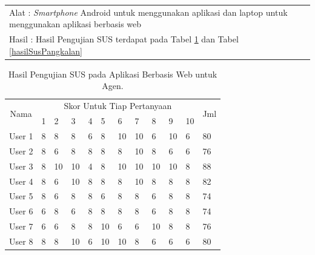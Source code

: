 	\begin{center}
	\begin{tabular}{ |p{12cm}|  }
		\hline
		Alat   : \textit{Smartphone} Android untuk menggunakan aplikasi dan laptop untuk menggunakan aplikasi berbasis web\\
		Hasil : Hasil Pengujian SUS terdapat pada Tabel \ref{hasilSusAgen} dan Tabel \ref{hasilSusPangkalan}\\
		\hline
	\end{tabular}
\end{center}

\begin{table}[H]
	\center
	\caption{Hasil Pengujian SUS pada Aplikasi Berbasis Web untuk Agen.}
	\label{hasilSusAgen}
	\begin{tabular}{|c|l|l|l|l|l|l|l|l|l|l|l|}
		\hline
		\multirow{2}{*}{Nama} & \multicolumn{10}{c|}{Skor Untuk Tiap Pertanyaan} &  \multirow{2}{0.5cm}{Jml} \\ \cline{2-11} 
		&1 &2  &3 &4 &5 &6 &7 &8 &9 &10& \\
		\hline
		User 1 &8 &8 &8 &6 &8 &10 &10 &6 &10 &6 &80 \\ 
		\hline
		User 2 &8 &6 &8 &8 &8 &8 &10 &8 &6 &6 &76 \\ 
		\hline
		User 3 &8 &10 &10 &4 &8 &10 &10 &10 &10 &8 &88 \\ 
		\hline
		User 4 &8 &6 &10 &8 &8 &8 &10 &8 &8 &8 &82 \\ 
		\hline
		User 5 &8 &6 &8 &8 &6 &8 &8 &6 &8 &8 &74 \\ 
		\hline
		User 6 &6 &8 &6 &8 &8 &8 &8 &6 &8 &8 &74 \\ 
		\hline
		User 7 &6 &6 &8 &8 &10 &6 &6 &10 &8 &8 &76 \\ 
		\hline
		User 8 &8 &8 &10 &6 &10 &10 &8 &6 &6 &6 &80 \\ 
		\hline
	\end{tabular}
\end{table}

